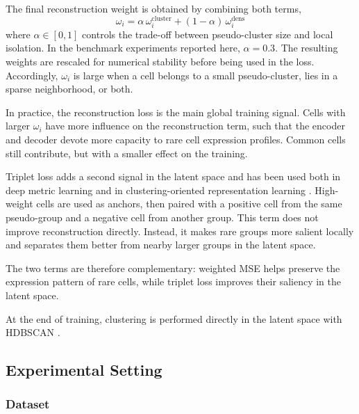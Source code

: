 \documentclass[11pt,a4paper]{article}
\begin{document}
The final reconstruction weight is obtained by combining both terms,
\begin{equation}
    \label{eq:omega_weight}
  \omega_i
  =
  \alpha\,\omega^{\mathrm{cluster}}_i
  +
  (1-\alpha)\,\omega^{\mathrm{dens}}_i
\end{equation}
where $\alpha \in [0,1]$ controls the trade-off between pseudo-cluster
size and local isolation. In the benchmark experiments reported here, $\alpha=0.3$.
The resulting weights are
rescaled for numerical stability before being used in the loss. Accordingly, $\omega_i$ is large when a cell belongs to a small
pseudo-cluster, lies
in a sparse neighborhood, or both.

In practice, the reconstruction loss is the main global training signal. Cells
with larger $\omega_i$ have more influence on the reconstruction term,
such that the encoder and decoder devote more capacity to rare cell expression
profiles. Common cells still contribute, but with a smaller effect on
the training.

Triplet loss adds a second signal in the latent space and has been used
both in deep metric learning and in clustering-oriented representation
learning \cite{schroff2015,yang2016}. High-weight
cells are used as anchors, then paired with a positive cell from the
same pseudo-group and a negative cell from another group. This term
does not improve reconstruction directly. Instead, it makes rare groups
more salient locally and separates them better from nearby larger
groups in the latent space.

The two terms are therefore complementary: weighted MSE helps preserve
the expression pattern of rare cells, while triplet loss improves their
saliency in the latent space.

At the end of training, clustering is performed directly in the latent space with HDBSCAN \cite{mcinnes2017}.

\subsection{Experimental Setting}



\subsubsection*{Dataset}
\end{document}
